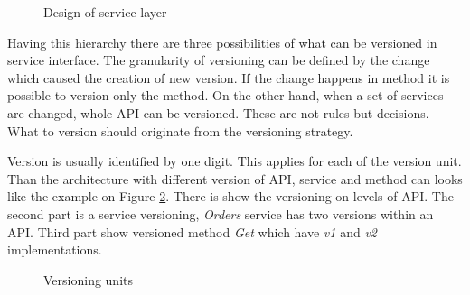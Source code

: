 \begin{figure}[htp] 
\caption{Design of service layer}
\label{fig:service-layer-design}
\end{figure} 

Having this hierarchy there are three possibilities of what can be versioned in service interface. The granularity of versioning can be defined by the change which caused the creation of new version. If the change happens in method it is possible to version only the method. On the other hand, when a set of services are changed, whole API can be versioned. These are not rules but decisions. What to version should originate from the versioning strategy. 

Version is usually identified by one digit. This applies for each of the version unit. Than the architecture with different version of API, service and method can looks like the example on Figure \ref{fig:version-unit}. There is show the versioning on levels of API. The second part is a service versioning, \emph{Orders} service has two versions within an API. Third part show versioned method \emph{Get} which have \emph{v1} and \emph{v2} implementations.

\begin{figure}[htp] 
\caption{Versioning units}
\label{fig:version-unit}
\end{figure} 

